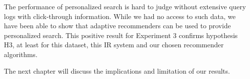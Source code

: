 The performance of personalized search is hard to judge without
extensive query logs with click-through information.
While we had no access to such data, 
we have been able to show that adaptive recommenders
can be used to provide personalized search.
This positive result for Experiment 3 confirms hypothesis H3,
at least for this dataset, this IR system and our chosen recommender algorithms.

The next chapter will discuss the implications and limitation of our results.

